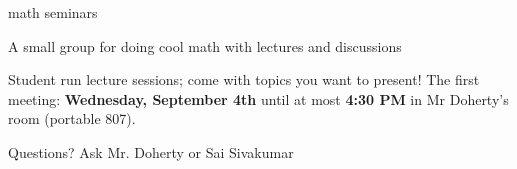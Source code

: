 \documentclass[11pt]{article}
\begin{document}
\thispagestyle{empty}
\begin{center}
\Huge{}math seminars\\
\begin{figure}
\end{figure}
\large{} A small group for doing cool math with lectures and discussions\\
\end{center}
Student run lecture sessions; come with topics you want to present! The first meeting: \textbf{Wednesday, September 4th} until at most \textbf{4:30 PM} in Mr Doherty's room (portable 807).
\begin{flushright}
Questions? Ask Mr. Doherty or Sai Sivakumar
\end{flushright}
\end{document}
